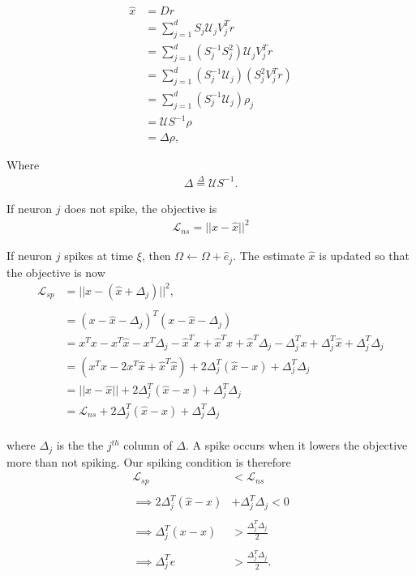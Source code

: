 \begin{enumerate}
\begin{align*}
    \hat{x} &= D r \\
    &= \sum_{j=1}^d S_j \mathcal{U}_j  V_j^T r\\
    &= \sum_{j=1}^d (S_j^{-1}S_j^2) \mathcal{U}_j  V_j^T r\\
    &=  \sum_{j=1}^d (S_j^{-1}  \mathcal{U}_j) (S_j^2 V_j^T r)\\
    &=  \sum_{j=1}^d (S_j^{-1}  \mathcal{U}_j) \rho_j \\
    &= \mathcal{U}S^{-1}\rho\\
    &= \Delta \rho, 
\end{align*}

Where
\begin{align}
    \label{eq:delta_dec}
    \Delta \overset{\Delta}{=} \mathcal{U} S^{-1}.
\end{align}

If neuron $j$ does not spike, the objective is
\begin{align*}
    \mathcal{L}_{ns} = ||x - \hat{x}||^2
\end{align*}
 
If neuron $j$ spikes at time $\xi$, then $\Omega \leftarrow \Omega + \hat{e}_j$. The estimate $\hat{x}$ is updated so that the objective is now
\begin{align*}
    \mathcal{L}_{sp} &= || x - (\hat{x} + \Delta_j) ||^2,\\
    \\
    &= 
    (x-\hat{x}-\Delta_j)^T (x-\hat{x}-\Delta_j)\\
    &= 
    x^T x - x^T \hat{x} - x^T \Delta_j
    - \hat{x}^T x +\hat{x}^T\hat{x} +\hat{x}^T \Delta_j
    -
    \Delta_j^T x + \Delta_j^T \hat{x} + \Delta_j^T \Delta_j
    \\
    &=
    \left(x^T x -2 x^T \hat{x} +\hat{x}^T\hat{x}  \right) + 
    2 \Delta_j^T \left( \hat{x} - x
    \right) + \Delta_j^T \Delta_j\\
    &= 
    ||x -\hat{x}|| +  2 \Delta_j^T \left( \hat{x} - x
    \right) + \Delta_j^T \Delta_j\\
    &= 
    \mathcal{L}_{ns} + 2 \Delta_j^T \left( \hat{x} - x
    \right) + \Delta_j^T \Delta_j\\
\end{align*}

where $\Delta_j$ is the the $j^{th}$ column of $\Delta$. A spike occurs when it lowers the objective more than not spiking. Our spiking condition is therefore
\begin{align*}
    \mathcal{L}_{sp} &< \mathcal{L}_{ns}\\
    \\
    \implies
     2 \Delta_j^T \left( \hat{x} - x
    \right) &+ \Delta_j^T \Delta_j < 0\\
    \\
    \implies 
    \Delta_j^T \left(x -\hat{x} \right) &> \frac{\Delta_j ^T \Delta_j}{2}\\
    \\
    \implies
    \Delta_j^T e &> \frac{\Delta_j^T \Delta_j}{2}.
\end{align*}


\end{enumerate}
